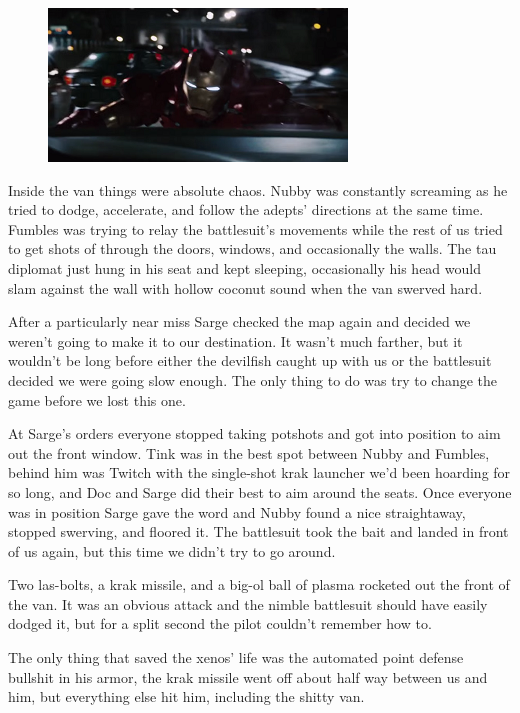 \begin{figure}
	\begin{center}
		\includegraphics[width=\figwidth]{pics/10/70.png}
	\end{center}
\end{figure}
Inside the van things were absolute chaos. 
Nubby was constantly screaming as he tried to dodge, accelerate, and follow the adepts' directions at the same time. 
Fumbles was trying to relay the battlesuit's movements while the rest of us tried to get shots of through the doors, windows, and occasionally the walls. 
The tau diplomat just hung in his seat and kept sleeping, occasionally his head would slam against the wall with hollow coconut sound when the van swerved hard.

After a particularly near miss Sarge checked the map again and decided we weren't going to make it to our destination. 
It wasn't much farther, but it wouldn't be long before either the devilfish caught up with us or the battlesuit decided we were going slow enough. 
The only thing to do was try to change the game before we lost this one.

At Sarge's orders everyone stopped taking potshots and got into position to aim out the front window. 
Tink was in the best spot between Nubby and Fumbles, behind him was Twitch with the single-shot krak launcher we'd been hoarding for so long, and Doc and Sarge did their best to aim around the seats. 
Once everyone was in position Sarge gave the word and Nubby found a nice straightaway, stopped swerving, and floored it. 
The battlesuit took the bait and landed in front of us again, but this time we didn't try to go around. 


Two las-bolts, a krak missile, and a big-ol ball of plasma rocketed out the front of the van. 
It was an obvious attack and the nimble battlesuit should have easily dodged it, but for a split second the pilot couldn't remember how to. 


The only thing that saved the xenos' life was the automated point defense bullshit in his armor, the krak missile went off about half way between us and him, but everything else hit him, including the shitty van.

